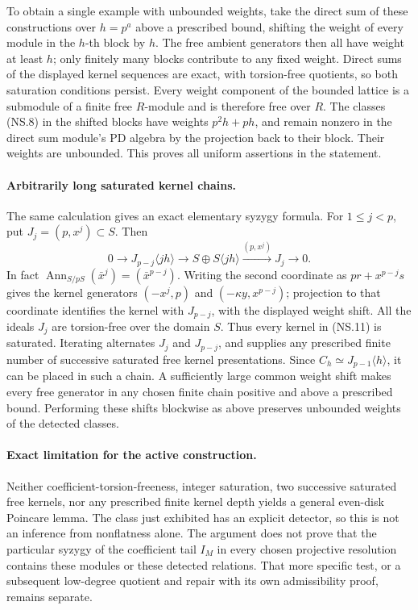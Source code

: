 To obtain a single example with unbounded weights, take the
direct sum of these constructions over \(h=p^a\) above a
prescribed bound, shifting the weight of every module in
the \(h\)-th block by \(h\). The free ambient generators
then all have weight at least \(h\); only finitely many
blocks contribute to any fixed weight. Direct sums of the
displayed kernel sequences are exact, with torsion-free
quotients, so both saturation conditions persist.
Every weight component of the bounded lattice is a submodule
of a finite free \(R\)-module and is therefore free over \(R\).
The classes (NS.8) in the shifted blocks have weights
\(p^2h+ph\), and remain nonzero in the direct sum module's
PD algebra by the projection back to their block. Their
weights are unbounded. This proves all uniform assertions
in the statement.

\paragraph{Arbitrarily long saturated kernel chains.}
The same calculation gives an exact elementary syzygy formula.
For \(1\leq j<p\), put \(J_j=(p,x^j)\subset S\).
Then
\[
 0\longrightarrow J_{p-j}\langle jh\rangle
 \longrightarrow S\oplus S\langle jh\rangle
 \xrightarrow{(p,x^j)}J_j\longrightarrow0.              \tag{NS.11}
\]
In fact \(\operatorname{Ann}_{S/pS}(\bar x^j)
=(\bar x^{p-j})\). Writing the second coordinate as
\(p r+x^{p-j}s\) gives the kernel generators
\((-x^j,p)\) and \((-\kappa y,x^{p-j})\);
projection to that coordinate identifies the kernel with
\(J_{p-j}\), with the displayed weight shift.
All the ideals \(J_j\) are torsion-free over the domain
\(S\). Thus every kernel in (NS.11) is saturated.
Iterating alternates \(J_j\) and \(J_{p-j}\), and supplies
any prescribed finite number of successive saturated free
kernel presentations. Since \(C_h\simeq J_{p-1}\langle h\rangle\),
it can be placed in such a chain. A sufficiently large common
weight shift makes every free generator in any chosen finite
chain positive and above a prescribed bound. Performing these
shifts blockwise as above preserves unbounded weights of the
detected classes.

\paragraph{Exact limitation for the active construction.}
Neither coefficient-torsion-freeness, integer saturation,
two successive saturated free kernels, nor any prescribed
finite kernel depth yields a general even-disk Poincare lemma.
The class just exhibited has an explicit detector, so this is
not an inference from nonflatness alone.
The argument does not prove that the particular syzygy of
the coefficient tail \(I_M\) in every chosen projective
resolution contains these modules or these detected relations.
That more specific test, or a subsequent low-degree quotient
and repair with its own admissibility proof, remains separate.

